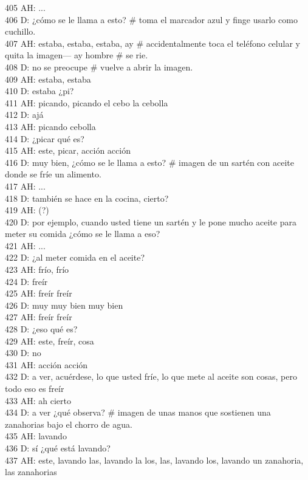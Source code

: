 405 AH: ...\\
406 D: ¿cómo se le llama a esto? \# toma el marcador azul y finge usarlo como cuchillo.\\
407 AH: estaba, estaba, estaba, ay \# accidentalmente toca el teléfono celular y quita la imagen--- ay hombre \# se rie.\\
408 D: no se preocupe \# vuelve a abrir la imagen.\\
409 AH: estaba, estaba\\
410 D: estaba ¿pi?\\
411 AH: picando, picando el cebo la cebolla\\
412 D: ajá\\
413 AH: picando cebolla\\
414 D: ¿picar qué es?\\
415 AH: este, picar, acción acción\\
416 D: muy bien, ¿cómo se le llama a esto? \# imagen de un sartén con aceite donde se fríe un alimento.\\
417 AH: ...\\
418 D: también se hace en la cocina, cierto?\\
419 AH: (?)\\
420 D: por ejemplo, cuando usted tiene un sartén y le pone mucho aceite para meter su comida ¿cómo se le llama a eso?\\
421 AH: ...\\
422 D: ¿al meter comida en el aceite?\\
423 AH: frío, frío\\
424 D: freír\\
425 AH: freír freír\\
426 D: muy muy bien muy bien\\
427 AH: freír freír\\
428 D: ¿eso qué es?\\
429 AH: este, freír, cosa\\
430 D: no\\
431 AH: acción acción\\
432 D: a ver, acuérdese, lo que usted fríe, lo que mete al aceite son cosas, pero todo eso es freír\\
433 AH: ah cierto\\
434 D: a ver ¿qué observa? \# imagen de unas manos que sostienen una zanahorias bajo el chorro de agua.\\
435 AH: lavando\\
436 D: sí ¿qué está lavando?\\
437 AH: este, lavando las, lavando la los, las, lavando los, lavando un zanahoria, las zanahorias\\
